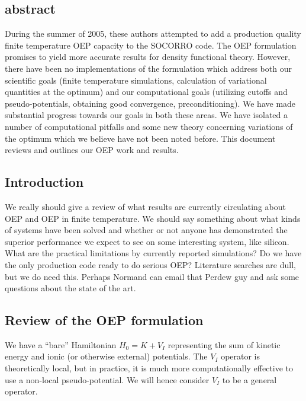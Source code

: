 \documentclass{article}
\newcommand{\Red}{\color{red}}
\begin{document}
\subsection{abstract}
During the summer of 2005, these authors attempted to add a production
quality finite temperature OEP capacity to the SOCORRO code.  The OEP
formulation promises to yield more accurate results for density functional
theory.  However, there have been no implementations of the formulation
which address both our scientific goals (finite temperature simulations,
calculation of variational quantities at the optimum) and our
computational goals (utilizing cutoffs and pseudo-potentials,
obtaining good convergence, preconditioning).  We have made substantial
progress towards our goals in both these areas.  We have isolated a number
of computational pitfalls and some new theory concerning variations of the
optimum which we believe have not been noted before.  This document 
reviews and outlines our OEP work and results.

\subsection{Introduction}

{\Red
We really should give a review of what results are currently circulating
about OEP and OEP in finite temperature.  We should say something about
what kinds of systems have been solved and whether or not anyone has
demonstrated the superior performance we expect to see on some interesting
system, like silicon.  What are the practical limitations by currently
reported simulations?  Do we have the only production code ready to do
serious OEP?  Literature searches are dull, but we do need this.  Perhaps
Normand can email that Perdew guy and ask some questions about the state
of the art.
}

\subsection{Review of the OEP formulation}

We have a ``bare'' Hamiltonian $H_0 = K + V_{I}$ representing
the sum of kinetic energy and ionic (or otherwise external) potentials.
The $V_{I}$ operator is theoretically local, but in practice, it is
much more computationally effective to use a non-local pseudo-potential.
We will hence consider $V_{I}$ to be a general operator.
\end{document}
